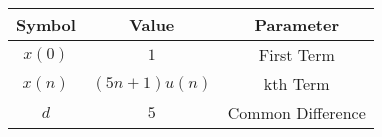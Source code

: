 
\begin{tabular}{|c|c|c|}
\hline
\textbf{Symbol} & \textbf{Value} & \textbf{Parameter} \\
\hline
\(x(0)\) & \(1 \) & First Term \\
\hline
\(x(n)\) & \((5n+1)u(n)\) & kth Term \\
\hline
\(d\) & \(5 \) & Common Difference \\
\hline
\end{tabular}
